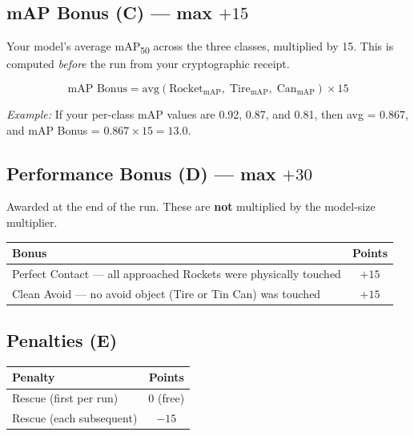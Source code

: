 \documentclass[a4]{article}
\begin{document}
\subsection*{mAP Bonus (C) --- max $+15$}

Your model's average mAP\textsubscript{50} across the three classes, multiplied by 15. This is computed \textit{before} the run from your cryptographic receipt.

\begin{equation*}
\text{mAP Bonus} = \text{avg}(\text{Rocket}_{\text{mAP}},\;\text{Tire}_{\text{mAP}},\;\text{Can}_{\text{mAP}}) \times 15
\end{equation*}

\textit{Example:} If your per-class mAP values are 0.92, 0.87, and 0.81, then avg = 0.867, and mAP Bonus = $0.867 \times 15 = 13.0$.

\subsection*{Performance Bonus (D) --- max $+30$}

Awarded at the end of the run. These are \textbf{not} multiplied by the model-size multiplier.

\begin{table}[H]
\centering
\begin{tabular}{lc}
\toprule
\textbf{Bonus} & \textbf{Points} \\
\midrule
Perfect Contact --- all approached Rockets were physically touched & $+15$ \\
Clean Avoid --- no avoid object (Tire or Tin Can) was touched & $+15$ \\
\bottomrule
\end{tabular}
\end{table}

\subsection*{Penalties (E)}

\begin{table}[H]
\centering
\begin{tabular}{lc}
\toprule
\textbf{Penalty} & \textbf{Points} \\
\midrule
Rescue (first per run) & $0$ (free) \\
Rescue (each subsequent) & $-15$ \\
\bottomrule
\end{tabular}
\end{table}
\end{document}
